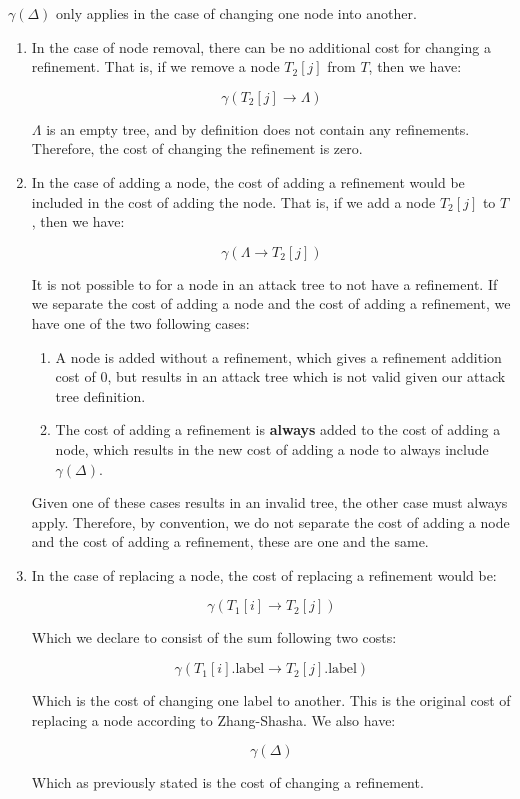 \begin{lemma}\label{lem:gamma-delta}

      $\gamma(\Delta)$ only applies in the case of changing one node into another.


\begin{enumerate} 
\item In the case of node removal, there can be no additional cost for changing a refinement. That is, if we remove a node $T_2[j]$ from $T$, then we have:

$$\gamma(T_2[j] \rightarrow {\Lambda})$$

            $\Lambda$ is an empty tree, and by definition does not contain any refinements. Therefore, the cost of changing the refinement is zero.

\item In the case of adding a node, the cost of adding a refinement would be included in the cost of adding the node. That is, if we add a node $T_2[j]$ to $T$, then we have:

$$\gamma(\Lambda \rightarrow {T_2[j]})$$

It is not possible to for a node in an attack tree to not have a refinement. If we separate the cost of adding a node and the cost of adding a refinement, we have one of the two following cases:
\begin{enumerate}
      \item A node is added without a refinement, which gives a refinement addition cost of 0, but results in an attack tree which is not valid given our attack tree definition.
      \item The cost of adding a refinement is \textbf{always} added to the cost of adding a node, which results in the new cost of adding a node to always include $\gamma(\Delta)$.
\end{enumerate}

Given one of these cases results in an invalid tree, the other case must always apply. Therefore, by convention, we do not separate the cost of adding a node and the cost of adding a refinement, these are one and the same.

      \item In the case of replacing a node, the cost of replacing a refinement would be:

$$\gamma({T_1[i]} \rightarrow {T_2[j]})$$

Which we declare to consist of the sum following two costs:

$$\gamma({T_1[i].\text{label}} \rightarrow {T_2[j].\text{label}})$$

Which is the cost of changing one label to another. This is the original cost of replacing a node according to Zhang-Shasha. We also have:

$$\gamma(\Delta)$$

Which as previously stated is the cost of changing a refinement.



\end{enumerate}

\end{lemma}




